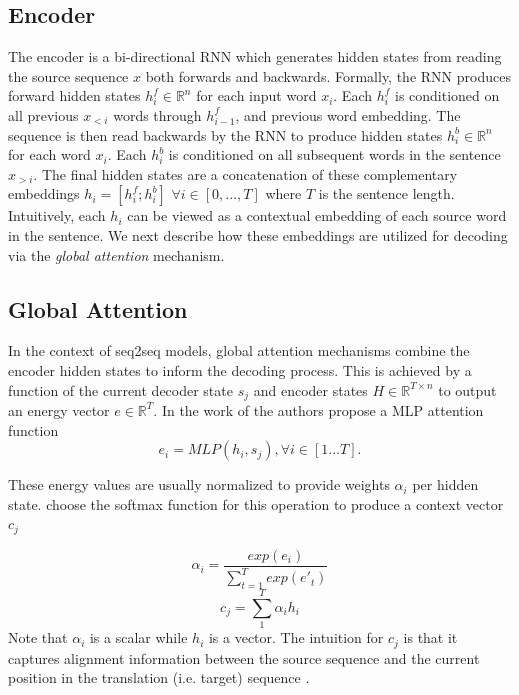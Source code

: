 \subsection{Encoder}
The encoder is a bi-directional \ac{RNN} which generates hidden states from reading the source sequence $x$ both forwards and backwards. Formally, the \ac{RNN} produces forward hidden states $h^{f}_{i} \in \mathbb{R}^{n}$ for each input word $x_{i}$. Each $h^{f}_{i}$ is conditioned on all previous $x_{<i}$ words through $h_{i-1}^{f}$, and previous word embedding. The sequence is then read backwards by the \ac{RNN} to produce hidden states $h^{b}_{i} \in \mathbb{R}^{n}$ for each word $x_{i}$. Each $h^{b}_{i}$ is conditioned on all subsequent words in the sentence $x_{>i}$. The final hidden states are a concatenation of these complementary embeddings $h_{i}  = [h^{f}_{i} ; h^{b}_{i}]$ $ \forall i \in [0,...,T]$ where $T$ is the sentence length. Intuitively, each $h_{i}$ can be viewed as a contextual embedding of each source word in the sentence. We next describe how these embeddings are utilized for decoding via the \textit{global attention} mechanism. %

\subsection{Global Attention}

In the context of \ac{seq2seq} models, global attention mechanisms combine the encoder hidden states to inform the decoding process. This is achieved by a function of the current decoder state $s_{j}$ and encoder states $H \in \mathbb{R}^{T \times n}$ to output an energy vector $e \in \mathbb{R}^{T}$. In the work of \citet{bahdanau2014NMTBYJoint} the authors propose a \ac{MLP} attention function
\begin{equation}
e_{i} = MLP(h_{i}, s_{j}), \forall i \in [1...T].
\end{equation}

These energy values are usually normalized to provide weights $\alpha_{i}$ per hidden state. \citet{bahdanau2014NMTBYJoint} choose the softmax function for this operation to produce a context vector $c_{j}$

\begin{equation}
	\alpha_{i} = \frac{exp(e_{i})}{\sum_{t=1}^{T} exp(e'_{t})}
\end{equation}
\begin{equation}
c_{j} = \sum_{1}^{T} \alpha_{i}  h_{i}
\end{equation}
Note that $\alpha_{i}$ is  a scalar while $h_{i}$ is a vector. The intuition for $c_{j}$ is that it captures alignment information between the source sequence and the current position in the translation (i.e. target) sequence \cite{bahdanau2014NMTBYJoint}. %

